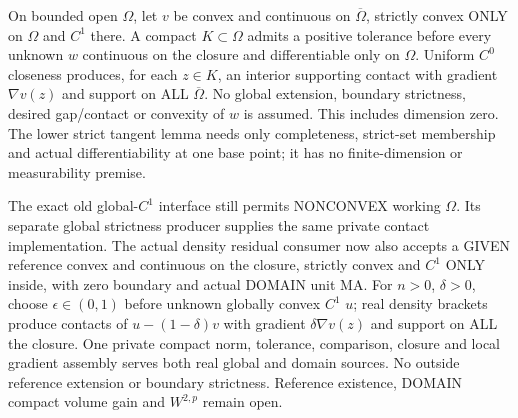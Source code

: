 \begin{lemma}
  \label{lem:convex-contact-perturbation}
  \leanok
  On bounded open $\Omega$, let $v$ be convex and continuous on
  $\overline\Omega$, strictly convex ONLY on $\Omega$ and $C^1$ there.
  A compact $K\subset\Omega$ admits a positive tolerance before every unknown
  $w$ continuous on the closure and differentiable only on $\Omega$.
  Uniform $C^0$ closeness produces, for each $z\in K$, an interior supporting
  contact with gradient $\nabla v(z)$ and support on ALL $\overline\Omega$.
  No global extension, boundary strictness, desired gap/contact or convexity of
  $w$ is assumed. This includes dimension zero. The lower strict tangent lemma
  needs only completeness, strict-set membership and actual differentiability at
  one base point; it has no finite-dimension or measurability premise.

  The exact old global-$C^1$ interface still permits NONCONVEX working $\Omega$.
  Its separate global strictness producer supplies the same private contact
  implementation. The actual density residual consumer now also accepts a GIVEN
  reference convex and continuous on the closure, strictly convex and $C^1$ ONLY
  inside, with zero boundary and actual DOMAIN unit MA. For $n>0$, $\delta>0$,
  choose $\epsilon\in(0,1)$ before unknown globally convex $C^1$ $u$; real
  density brackets produce contacts of $u-(1-\delta)v$ with gradient
  $\delta\nabla v(z)$ and support on ALL the closure. One private compact norm,
  tolerance, comparison, closure and local gradient assembly serves both real
  global and domain sources. No outside reference extension or boundary strictness.
  Reference existence, DOMAIN compact volume gain and $W^{2,p}$ remain open.
\end{lemma}
